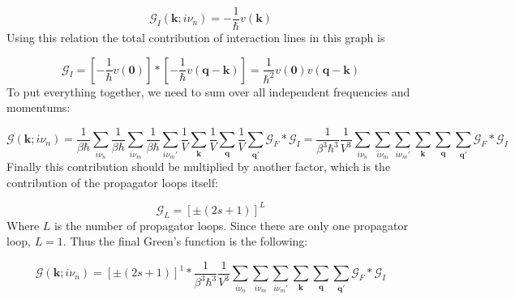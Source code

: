\begin{equation} \label{eq:5}
\mathcal{G}_{I} \left( \boldsymbol{k}; i \nu_{n} \right)
=
- \frac{1}{\hbar} v \left( \boldsymbol{k} \right)
\end{equation}
Using this relation the total contribution of interaction lines in this graph is

\begin{equation} \label{eq:6}
\mathcal{G}_{I}
=
\left[ - \frac{1}{\hbar} v \left( \boldsymbol{0} \right) \right]
*
\left[ - \frac{1}{\hbar} v \left( \boldsymbol{q} - \boldsymbol{k} \right) \right]
=
\frac{1}{\hbar^{2}} v \left( \boldsymbol{0} \right) v \left( \boldsymbol{q} - \boldsymbol{k} \right)
\end{equation}
To put everything together, we need to sum over all independent frequencies and momentums:

\begin{equation} \label{eq:7}
\mathcal{G} \left( \boldsymbol{k}; i \nu_{n} \right)
=
\frac{1}{\beta \hbar} \sum_{i \nu_{n}}
\frac{1}{\beta \hbar} \sum_{i \nu_{m}}
\frac{1}{\beta \hbar} \sum_{i \nu_{m}'}
\frac{1}{V} \sum_{\boldsymbol{k}}
\frac{1}{V} \sum_{\boldsymbol{q}}
\frac{1}{V} \sum_{\boldsymbol{q}'}
\mathcal{G}_{F} * \mathcal{G}_{I}
=
\frac{1}{\beta^{3} \hbar^{3}} \frac{1}{V^{3}}
\sum_{i \nu_{n}}
\sum_{i \nu_{m}}
\sum_{i \nu_{m}'}
\sum_{\boldsymbol{k}}
\sum_{\boldsymbol{q}}
\sum_{\boldsymbol{q}'}
\mathcal{G}_{F} * \mathcal{G}_{I}
\end{equation}
Finally this contribution should be multiplied by another factor, which is the contribution of the propagator loops itself:

\begin{equation} \label{eq:8}
\mathcal{G}_{L}
=
\left[ \pm \left( 2s + 1 \right) \right]^{L}
\end{equation}
Where $L$ is the number of propagator loops. Since there are only one propagator loop, $L = 1$. Thus the final Green's function is the following:

\begin{equation} \label{eq:9}
\mathcal{G} \left( \boldsymbol{k}; i \nu_{n} \right)
=
\left[ \pm \left( 2s + 1 \right) \right]^{1} *
\frac{1}{\beta^{3} \hbar^{3}} \frac{1}{V^{3}}
\sum_{i \nu_{n}}
\sum_{i \nu_{m}}
\sum_{i \nu_{m}'}
\sum_{\boldsymbol{k}}
\sum_{\boldsymbol{q}}
\sum_{\boldsymbol{q}'}
\mathcal{G}_{F} * \mathcal{G}_{I}
\end{equation}